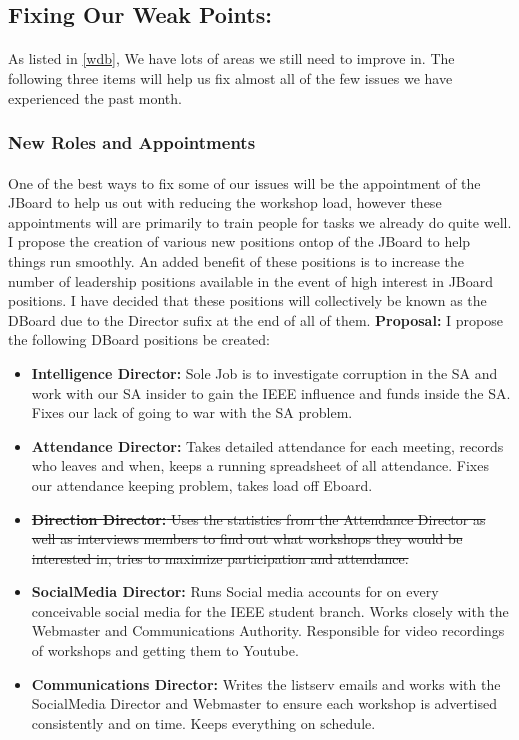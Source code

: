 \documentclass{article}
\begin{document}
\subsection{Fixing Our Weak Points:}\label{db}
\paragraph{}
As listed in \ref{wdb}, We have lots of areas we still need to improve in. The following three items will help us fix almost all of the few issues we have experienced the past month.

\subsubsection{New Roles and Appointments}
\paragraph{}
One of the best ways to fix some of our issues will be the appointment of the JBoard to help us out with reducing the workshop load, however these appointments will are primarily to train people for tasks we already do quite well. I propose the creation of various new positions ontop of the JBoard to help things run smoothly. An added benefit of these positions is to increase the number of leadership positions available in the event of high interest in JBoard positions. I have decided that these positions will collectively be known as the DBoard due to the Director sufix at the end of all of them.
\newline\newline
\textbf{Proposal:} I propose the following DBoard positions be created:  
\begin{itemize}
    \item \textbf{Intelligence Director:} Sole Job is to investigate corruption in the SA and work with our SA insider to gain the IEEE influence and funds inside the SA. Fixes our lack of going to war with the SA problem.  
    \item \textbf{Attendance Director:} Takes detailed attendance for each meeting, records who leaves and when, keeps a running spreadsheet of all attendance. Fixes our attendance keeping problem, takes load off Eboard.
    \item \sout{\textbf{Direction Director:} Uses the statistics from the Attendance Director as well as interviews members to find out what workshops they would be interested in, tries to maximize participation and attendance.} 
    \item \textbf{SocialMedia Director:} Runs Social media accounts for on every conceivable social media for the IEEE student branch. Works closely with the Webmaster and Communications Authority. Responsible for video recordings of workshops and getting them to Youtube.
    \item \textbf{Communications Director:} Writes the listserv emails and works with the SocialMedia Director and Webmaster to ensure each workshop is advertised consistently and on time. Keeps everything on schedule. 
\end{itemize}
\end{document}
